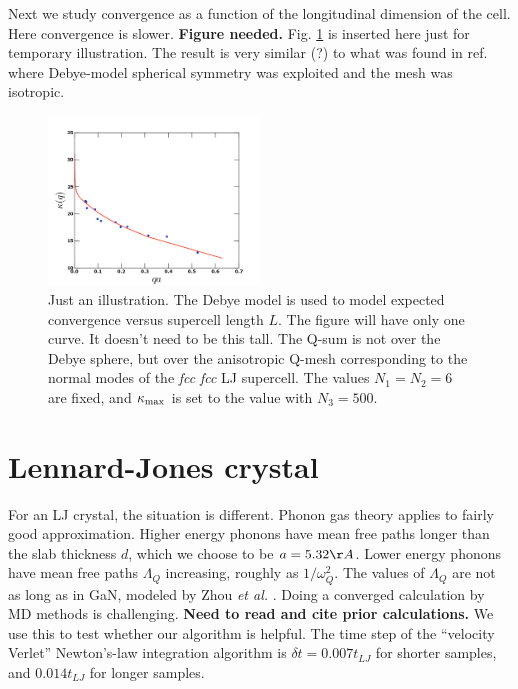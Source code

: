 \documentclass[aps,prb,twocolumn,showpacs,superscriptaddress]{revtex4-1}\begin{tiny}\end{tiny}
\begin{document}
{Next we study convergence as a function of the longitudinal dimension of the cell.
Here convergence is slower. {\bf Figure needed.} Fig. \ref{fig:powerlaw} is inserted
here just for temporary illustration.  The result is very similar (?) to what was found in
ref. where Debye-model spherical symmetry was exploited and the mesh was isotropic.
\par
\begin{figure}[top]
\includegraphics[angle=0,width=0.5\textwidth]{extrapolation15.pdf}%
\caption{\label{fig:powerlaw} Just an illustration.  The Debye
model is used to model expected convergence versus supercell length $L$.  The figure will
have only one curve.  It doesn't need to be this tall.  The Q-sum is not over the
Debye sphere, but over the anisotropic Q-mesh corresponding to the
normal modes of the {\it fcc} {\it fcc} LJ supercell.  The values $N_1 = N_2 = 6$ are fixed,
and $\kappa_{\rm max}$ is set to the value with $N_3=500$.}
\label{fig:powerlaw}
\end{figure}
\par


\section{Lennard-Jones crystal}
\label{sec:LJC}

For an LJ crystal, the situation is different.  Phonon gas theory
applies to fairly good approximation.   
Higher energy phonons have mean free paths
longer than the slab thickness $d$, which we choose to be $a = 5.32 \AA$.
Lower energy phonons have mean free paths $\Lambda_Q$ increasing,
roughly as $1/\omega_Q^2$.  The values of $\Lambda_Q$ are not as long as in GaN, 
modeled by Zhou {\it et al.} \cite{Zhou}.  
Doing a converged calculation by MD methods is challenging.  {\bf Need to read and
cite prior calculations.}  We use this to test whether our algorithm is helpful.   
The time step of the ``velocity Verlet''  Newton's-law 
integration algorithm \cite{Hansen,Verlet} is $\delta t = 0.007 t_{LJ}$ for shorter samples,
and $0.014 t_{LJ}$ for longer samples.

}
\end{document}
